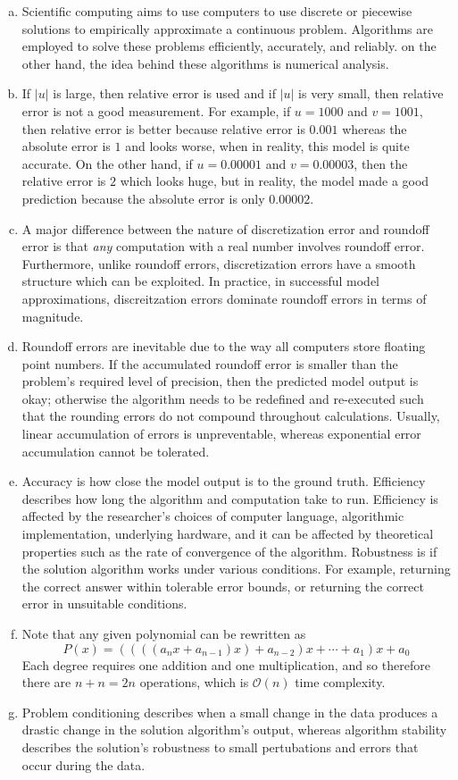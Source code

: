 \documentclass[12pt]{scrartcl}
\begin{document}
\begin{enumerate}[(a)]
  \item Scientific computing aims to use computers to use discrete or piecewise solutions to empirically approximate 
  a continuous problem. Algorithms are employed to solve these problems efficiently, accurately, and reliably. 
  on the other hand, the idea behind these algorithms is numerical analysis. 
  \item If $|u|$ is large, then relative error is used and if $|u|$ is very small, 
  then relative error is not a good measurement. For example, if $u = 1000$ and $v = 1001$, then 
  relative error is better because relative error is $0.001$ whereas the absolute error is $1$ and looks worse, when in reality, 
  this model is quite accurate. On the other hand, if $u = 0.00001$ and $v = 0.00003$, then 
  the relative error is $2$ which looks huge, but in reality, the model made a good prediction because 
  the absolute error is only $0.00002$.
  \item A major difference between the nature of discretization error and roundoff error is that 
  \textit{any} computation with a real number involves roundoff error. Furthermore, unlike 
  roundoff errors, discretization errors have a smooth structure which can be exploited. In practice, in successful
  model approximations, discreitzation errors dominate roundoff errors in terms of magnitude.
  \item Roundoff errors are inevitable due to the way all computers store floating point numbers. 
  If the accumulated roundoff error is smaller than the problem's required level of precision, then the 
  predicted model output is okay; otherwise the algorithm needs to be redefined and re-executed such that 
  the rounding errors do not compound throughout calculations. Usually, linear accumulation of errors is unpreventable, 
  whereas exponential error accumulation cannot be tolerated. 
  \item Accuracy is how close the model output is to the ground truth. Efficiency describes how long the algorithm 
  and computation take to run. Efficiency is affected by the researcher's choices of computer language, algorithmic implementation, 
  underlying hardware, and it can be affected by theoretical properties such as the rate of convergence of the algorithm. Robustness is 
  if the solution algorithm works under various conditions. For example, returning the correct answer within 
  tolerable error bounds, or returning the correct error in unsuitable conditions. 
  \item Note that any given polynomial can be rewritten as 
  \[P(x) = ((((a_n x + a_{n-1})x) + a_{n-2})x + \cdots + a_1)x + a_0\]
  Each degree requires one addition and one multiplication, and so therefore there are $n + n = 2n$
  operations, which is $\mathcal{O}(n)$ time complexity.
  \item Problem conditioning describes when a small change in the data produces a drastic change in the solution algorithm's output, whereas 
  algorithm stability describes the solution's robustness to small pertubations and errors that occur during the data. 
  
\end{enumerate}
\end{document}
